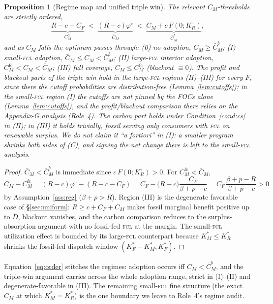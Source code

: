 \documentclass[11pt,reqno]{amsart}
\theoremstyle{plain}
\newtheorem{proposition}{Proposition}
\theoremstyle{definition}
\theoremstyle{remark}
\newcommand{\KRs}{K_R^{*}}
\newcommand{\KFs}{K_F^{*}}
\newcommand{\KMs}{K_M^{*}}
\newcommand{\KRo}{K_R^{\circ}}
\newcommand{\Dbar}{\bar D}
\newcommand{\CM}{C_M}
\newcommand{\CF}{C_F}
\newcommand{\CMbar}{\bar C_M}
\newcommand{\bp}{\beta+p}
\begin{document}
\begin{proposition}[Regime map and unified triple win]\label{prop:regimes}
The relevant $\CM$-thresholds are strictly ordered,
\begin{equation}\label{eq:order}
  \underbrace{R-c-\CF}_{\CM^{\mathrm{fc}}}
  \;<\;
  \underbrace{(R-c)\varphi^{\circ}}_{\CMbar}
  \;<\;
  \underbrace{\CMbar+c\,F(0;\KRo)}_{\CMbar^{b}},
\end{equation}
and as $\CM$ falls the optimum passes through:
\textup{(0)} no adoption, $\CM\ge\CMbar^{b}$;
\textup{(I)} small-\textsc{fcl} adoption, $\CMbar\le\CM<\CMbar^{b}$;
\textup{(II)} large-\textsc{fcl} interior adoption, $\CM^{\mathrm{fc}}<\CM<\CMbar$;
\textup{(III)} full coverage, $\CM\le\CM^{\mathrm{fc}}$ (blackout $\equiv0$).
The profit and blackout parts of the triple win hold in the
\emph{large}-\textsc{fcl} regions \textup{(II)--(III)} for every $F$, since there
the cutoff probabilities are distribution-free (Lemma~\ref{lem:cutoffs}); in the
small-\textsc{fcl} region \textup{(I)} the cutoffs are not pinned by the FOCs alone
(Lemma~\ref{lem:cutoffs}), and the profit/blackout comparison there relies on the
Appendix-G analysis (Role~4). The carbon part holds under Condition~\ref{cond:cs}
in \textup{(II)}; in \textup{(III)} it holds trivially, fossil serving only
consumers with \textsc{fcl} on renewable surplus. We do \emph{not} claim it
``a fortiori'' in \textup{(I)}: a smaller program shrinks both sides of (C), and
signing the net change there is left to the small-\textsc{fcl} analysis.
\end{proposition}

\begin{proof}
$\CMbar<\CMbar^{b}$ is immediate since $c\,F(0;\KRo)>0$. For
$\CM^{\mathrm{fc}}<\CMbar$,
\[
  \CMbar-\CM^{\mathrm{fc}}
  =(R-c)\varphi^{\circ}-(R-c-\CF)
  =\CF-\big(R-c\big)\frac{\CF}{\bp-c}
  =\CF\,\frac{\bp-R}{\bp-c}>0
\]
by Assumption~\ref{ass:reg} ($\bp>R$). Region (III) is the degenerate
favorable case of \S\ref{sec:uniform}: $R\ge c+\CF+\CM$ makes fossil
marginal benefit positive up to $\Dbar$, blackout vanishes, and the carbon
comparison reduces to the surplus-absorption argument with no fossil-fed
\textsc{fcl} at the margin. The small-\textsc{fcl} utilization effect is bounded
by its large-\textsc{fcl} counterpart because $\KMs\le\KRs$ shrinks the
fossil-fed dispatch window $(\KFs-\KMs,\KFs)$.
\end{proof}

\noindent Equation~\eqref{eq:order} stitches the regimes: adoption occurs iff
$\CM<\CMbar^{b}$, and the triple-win argument carries across the whole adoption
range, strict in (I)--(II) and degenerate-favorable in (III). The remaining
small-\textsc{fcl} fine structure (the exact $\CM$ at which $\KMs=\KRs$) is the
one boundary we leave to Role~4's regime audit.
\end{document}
